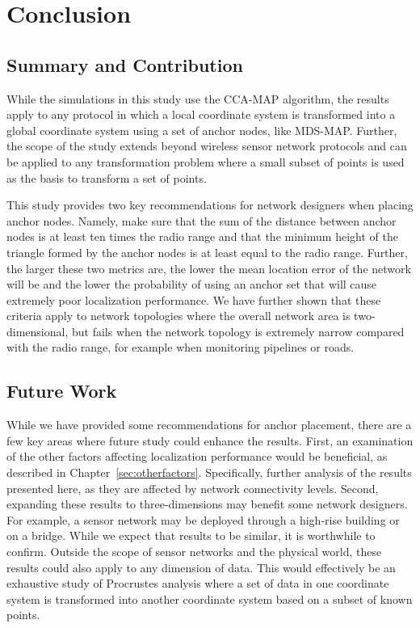 \chapter{Conclusion}

\section{Summary and Contribution}
While the simulations in this study use the CCA-MAP algorithm, the results apply to any protocol in which a local coordinate system is transformed into a global coordinate system using a set of anchor nodes, like MDS-MAP.  Further, the scope of the study extends beyond wireless sensor network protocols and can be applied to any transformation problem where a small subset of points is used as the basis to transform a set of points.

This study provides two key recommendations for network designers when placing anchor nodes.  Namely, make sure that the sum of the distance between anchor nodes is at least ten times the radio range and that the minimum height of the triangle formed by the anchor nodes is at least equal to the radio range.  Further, the larger these two metrics are, the lower the mean location error of the network will be and the lower the probability of using an anchor set that will cause extremely poor localization performance.  We have further shown that these criteria apply to network topologies where the overall network area is two-dimensional, but fails when the network topology is extremely narrow compared with the radio range, for example when monitoring pipelines or roads.

\section{Future Work}
While we have provided some recommendations for anchor placement, there are a few key areas where future study could enhance the results.  First, an examination of the other factors affecting localization performance would be beneficial, as described in Chapter~\ref{sec:otherfactors}.  Specifically, further analysis of the results presented here, as they are affected by network connectivity levels.  Second, expanding these results to three-dimensions may benefit some network designers.  For example, a sensor network may be deployed through a high-rise building or on a bridge.  While we expect that results to be similar, it is worthwhile to confirm.  Outside the scope of sensor networks and the physical world, these results could also apply to any dimension of data.  This would effectively be an exhaustive study of Procrustes analysis where a set of data in one coordinate system is transformed into another coordinate system based on a subset of known points.
